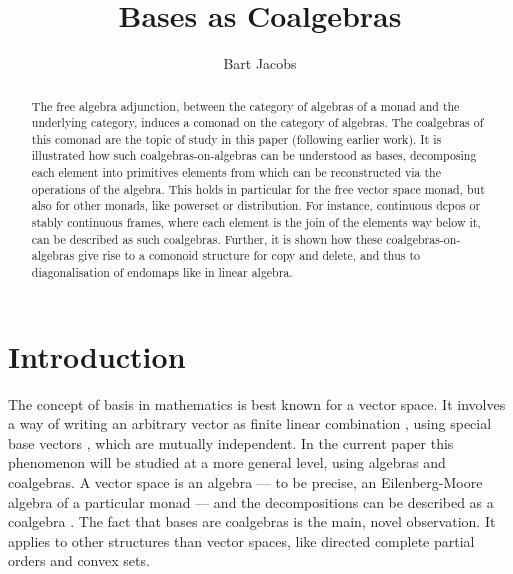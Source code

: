 \documentclass{LMCS}
\begin{document}
\title{Bases as Coalgebras}
\author[B. Jacobs]{Bart Jacobs}

\address{Institute for Computing and Information Sciences (iCIS), 
Radboud University Nijmegen, The Netherlands.} 




\begin{abstract}
The free algebra adjunction, between the category of algebras of a
monad and the underlying category, induces a comonad on the category
of algebras. The coalgebras of this comonad are the topic of study in
this paper (following earlier work).  It is illustrated how such
coalgebras-on-algebras can be understood as bases, decomposing each
element  into primitives elements from which  can be
reconstructed via the operations of the algebra. This holds in
particular for the free vector space monad, but also for other monads,
like powerset or distribution. For instance, continuous dcpos or
stably continuous frames, where each element is the join of the
elements way below it, can be described as such coalgebras. Further,
it is shown how these coalgebras-on-algebras give rise to a comonoid
structure for copy and delete, and thus to diagonalisation of endomaps
like in linear algebra.
\end{abstract}



\maketitle


\section{Introduction}\label{IntroSec}

The concept of basis in mathematics is best known for a vector space.
It involves a way of writing an arbitrary vector  as finite linear
combination , using special base vectors
, which are mutually independent. In the current paper this
phenomenon will be studied at a more general level, using algebras and
coalgebras.  A vector space is an algebra --- to be precise, an
Eilenberg-Moore algebra of a particular monad --- and the
decompositions can be described as a coalgebra . The fact that bases are coalgebras is the main, novel
observation. It applies to other structures than vector spaces, like
directed complete partial orders and convex sets.
\end{document}
